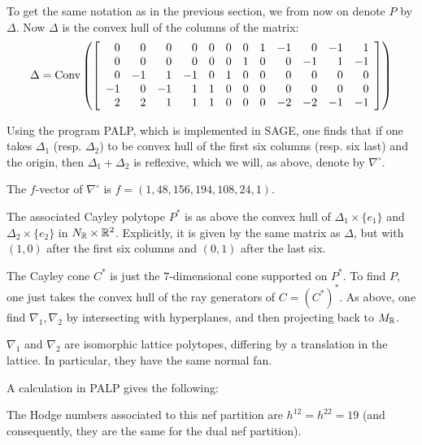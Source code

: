 \documentclass[11pt, english]{article}
\begin{document}

To get the same notation as in the previous section, we from now on denote $P$ by $\Delta$. Now $\Delta$ is the convex hull of the columns of the matrix:
\[
\Delta = \operatorname{Conv} \left(
\left[\begin{array}{rrrrrrrrrrrr}
0  & 0  & 0 & 0 & 0 & 0 &  0 & 1 & -1 & 0  & -1 & 1 \\
0  & 0  & 0 & 0 & 0 & 0 &  1 & 0 & 0  & -1 & 1  & -1 \\
0  & -1 & 1 & -1& 0 & 1 &  0 & 0 & 0  & 0  & 0  & 0 \\
-1 & 0  &-1 & 1 & 1 & 0 &  0 & 0 & 0  & 0  & 0  & 0 \\
2  & 2  & 1 & 1 & 1 & 0 &  0 & 0 & -2 & -2 & -1 & -1
\end{array}\right]\right)
\]

Using the program PALP, which is implemented in SAGE, one finds that if one takes $\Delta_1$ (resp. $\Delta_2$) to be convex hull of the first six columns (resp. six last) and the origin, then $\Delta_1+\Delta_2$ is reflexive, which we will, as above, denote by $\nabla^\circ$.

\begin{lemma}
  The $f$-vector of $\nabla^\circ$ is $f=(1, 48, 156, 194, 108, 24, 1)$. 
\end{lemma}

The associated Cayley polytope $P^\ast$ is as above the convex hull of $\Delta_1 \times \{ e_1\}$ and $\Delta_2 \times \{ e_2\} $ in $N_{\mathbb{R}} \times \mathbb{R}^2$. Explicitly, it is given by the same matrix as $\Delta$, but with $(1,0)$ after the first six columns and $(0,1)$ after the last six.

The Cayley cone $C^\ast$ is just the $7$-dimensional cone supported on $P^\ast$. To find $P$, one just takes the convex hull of the ray generators of $C=(C^\ast)^\ast$. As above, one find $\nabla_1,\nabla_2$ by intersecting with hyperplanes, and then projecting back to $M_{\mathbb{R}}$. 

\begin{lemma}
$\nabla_1$ and $\nabla_2$ are isomorphic lattice polytopes, differing by a translation in the lattice. In particular, they have the same normal fan.   
\end{lemma}

A calculation in PALP gives the following:
\begin{lemma}
The Hodge numbers associated to this nef partition are $h^{12}=h^{22}=19$ (and consequently, they are the same for the dual nef partition).
\end{lemma}
\end{document}
